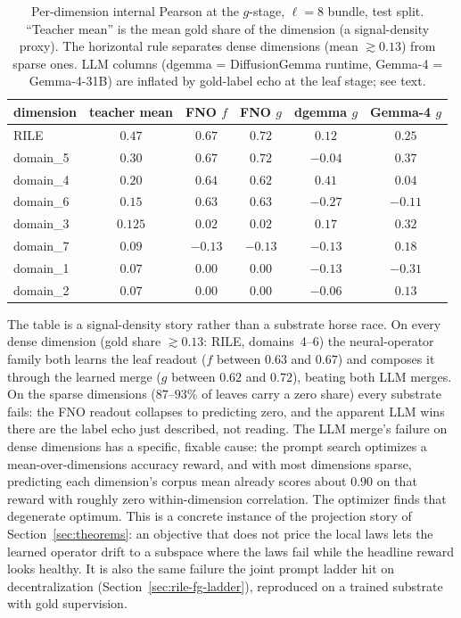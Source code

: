 \begin{table}[htbp]
    \centering
    \begin{tabular}{lccccc}
    \toprule
    dimension & teacher mean & FNO $f$ & FNO $g$ & dgemma $g$ & Gemma-4 $g$ \\
    \midrule
    RILE       & $0.47$  & $0.67$ & $\mathbf{0.72}$ & $0.12$  & $0.25$ \\
    domain\_5  & $0.30$  & $0.67$ & $\mathbf{0.72}$ & $-0.04$ & $0.37$ \\
    domain\_4  & $0.20$  & $0.64$ & $\mathbf{0.62}$ & $0.41$  & $0.04$ \\
    domain\_6  & $0.15$  & $0.63$ & $\mathbf{0.63}$ & $-0.27$ & $-0.11$ \\
    \midrule
    domain\_3  & $0.125$ & $0.02$ & $0.02$  & $0.17$  & $0.32$ \\
    domain\_7  & $0.09$  & $-0.13$ & $-0.13$ & $-0.13$ & $0.18$ \\
    domain\_1  & $0.07$  & $0.00$ & $0.00$  & $-0.13$ & $-0.31$ \\
    domain\_2  & $0.07$  & $0.00$ & $0.00$  & $-0.06$ & $0.13$ \\
    \bottomrule
    \end{tabular}
    \caption{Per-dimension internal Pearson at the $g$-stage, $\ell=8$
    bundle, test split. ``Teacher mean'' is the mean gold share of the
    dimension (a signal-density proxy). The horizontal rule separates
    dense dimensions (mean $\gtrsim 0.13$) from sparse ones. LLM
    columns (dgemma = DiffusionGemma runtime, Gemma-4 = Gemma-4-31B)
    are inflated by gold-label echo at the leaf stage; see text.}
    \label{tab:qsentence-perdim}
\end{table}

The table is a signal-density story rather than a substrate horse race.
On every dense dimension (gold share $\gtrsim 0.13$: RILE,
domains~4--6) the neural-operator family both learns the leaf readout
($f$ between $0.63$ and $0.67$) and composes it through the learned
merge ($g$ between $0.62$ and $0.72$), beating both LLM merges. On the
sparse dimensions ($87$--$93\%$ of leaves carry a zero share) every
substrate fails: the FNO readout collapses to predicting zero, and the
apparent LLM wins there are the label echo just described, not reading.
The LLM merge's failure on dense dimensions has a specific, fixable
cause: the prompt search optimizes a mean-over-dimensions accuracy
reward, and with most dimensions sparse, predicting each dimension's
corpus mean already scores about $0.90$ on that reward with roughly
zero within-dimension correlation. The optimizer finds that degenerate
optimum. This is a concrete instance of the projection story of
Section~\ref{sec:theorems}: an objective that does not price the local
laws lets the learned operator drift to a subspace where the laws fail
while the headline reward looks healthy. It is also the same failure
the joint prompt ladder hit on decentralization
(Section~\ref{sec:rile-fg-ladder}), reproduced on a trained substrate
with gold supervision.

